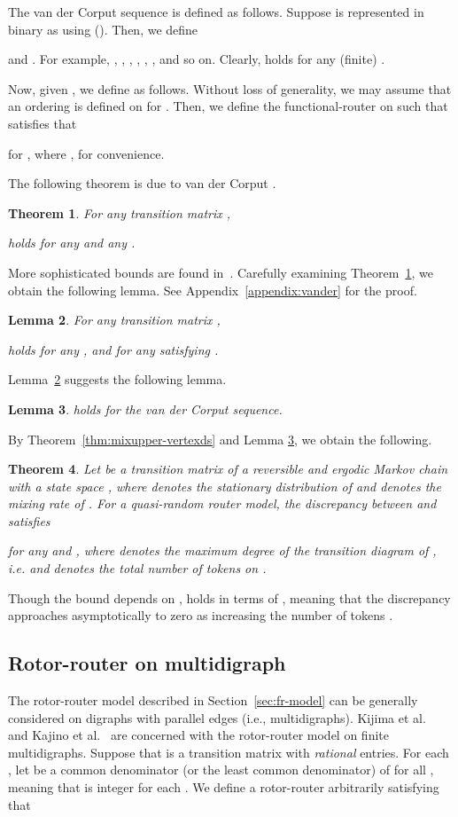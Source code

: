 \documentclass[letter, 11pt]{article}
\newcommand{\1}{\mbox{1}\hspace{-0.25em}\mbox{l}}
\newtheorem{theorem}{Theorem}[section]
\newtheorem{lemma}[theorem]{Lemma}
\begin{document}
The van der Corput sequence  is defined as follows.  
Suppose  
  is represented in binary as  
  using  (). 
 Then, we define  

and . 
 For example, 
, 
, 
, 
, 
, 
, 
and so on. 
 Clearly,  holds for any (finite) . 


Now, given , we define  as follows.
 Without loss of generality, 
  we may assume that an ordering  is defined on  for . 
 Then, 
  we define the functional-router  on  
  such that  satisfies that 

  for , 
 where , for convenience. 

The following theorem is due to van der Corput \cite{JGV35}. 
\begin{theorem}\label{thm:upper-logM}\cite{JGV35}
 For any transition matrix , 

 holds for any  and any . 
\end{theorem}
More sophisticated bounds are found in~\cite{N78}. 
Carefully examining Theorem~\ref{thm:upper-logM}, 
  we obtain the following lemma. 
  See Appendix~\ref{appendix:vander} for the proof. 
\begin{lemma}\label{bound:vandercz}
For any transition matrix , 

 holds for any , and for any  satisfying . 
\end{lemma}
Lemma~\ref{bound:vandercz} suggests the following lemma. 
\begin{lemma}\label{bound:vanderc}
 holds for the van der Corput sequence. 
\end{lemma}

By Theorem~\ref{thm:mixupper-vertexds} and Lemma \ref{bound:vanderc}, we obtain the following. 

\begin{theorem}
\label{thm:mixupper-vertexvc}
 Let  be a transition matrix of 
  a reversible and ergodic Markov chain with a state space , where  denotes the stationary distribution of  and  denotes the mixing rate of . 
  For a quasi-random router model, the discrepancy between  and  satisfies

for any  and , where  denotes the maximum degree of the transition diagram of , {\rm i.e.}  and  denotes the total number of tokens on . 
\end{theorem}
Though the bound depends on ,  
    holds in terms of , 
   meaning that the discrepancy approaches asymptotically to zero 
     as increasing the number of tokens . 

\subsection{Rotor-router on multidigraph}\label{sec:roter}
The rotor-router model described in Section~\ref{sec:fr-model} 
   can be generally considered on digraphs with parallel edges (i.e., multidigraphs). 
 Kijima et al.~\cite{KKM12} and Kajino et al.~\cite{KKM13} are concerned with 
   the rotor-router model on finite multidigraphs. 
 Suppose that  is a transition matrix with {\em rational} entries. 
 For each , 
  let 
   be a common denominator (or the least common denominator) 
   of  for all , 
  meaning that  is integer for each . 
 We define a rotor-router 
    arbitrarily 
  satisfying that 
\end{document}
